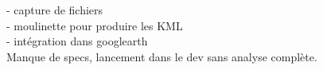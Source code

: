 - capture de fichiers\\
- moulinette pour produire les KML\\
- intégration dans googlearth\\
Manque de specs, lancement dans le dev sans analyse complète.\\
 
